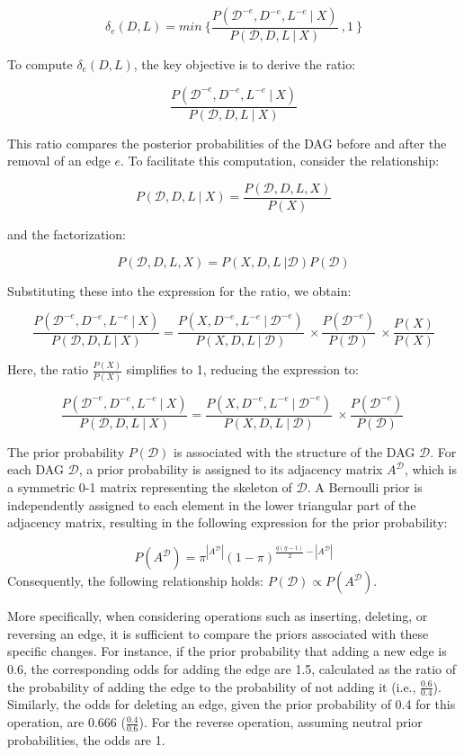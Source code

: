 \documentclass{report}
\begin{document}
$$
\delta_e (D,L) = min \  \Bigg\{ \frac{P(\mathcal{D}^{-e},D^{-e},L^{-e} \ | \ X)}{P(\mathcal{D},D,L \ | \ X)} \ ,1 \ \Bigg\} 
$$

To compute $\delta_e(D,L)$, the key objective is to derive the ratio:

$$
\frac{P(\mathcal{D}^{-e},D^{-e},L^{-e} \ | \ X)}{P(\mathcal{D},D,L \ | \ X)}
$$

This ratio compares the posterior probabilities of the DAG before and after the removal of an edge $e$. To facilitate this computation, consider the relationship:

$$
P(\mathcal{D},D,L \ | \ X) = \frac{P(\mathcal{D},D,L,X)}{P(X)}
$$

and the factorization:

$$
P(\mathcal{D},D,L,X) = P(X,D,L \ |\mathcal{D})P(\mathcal{D})
$$

Substituting these into the expression for the ratio, we obtain:

$$
\frac{P(\mathcal{D}^{-e},D^{-e},L^{-e} \ | \ X)}{P(\mathcal{D},D,L \ | \ X)} = \frac{P(X ,D^{-e},L^{-e} \ | \ \mathcal{D}^{-e})}{P(X,D,L \ | \ \mathcal{D})}\  \times \frac{P(\mathcal{D}^{-e})}{P(\mathcal{D})}\ \times \frac{P(X)}{P(X)} 
$$

Here, the ratio $\frac{P(X)}{P(X)}$  simplifies to 1, reducing the expression to:

$$
\frac{P(\mathcal{D}^{-e},D^{-e},L^{-e} \ | \ X)}{P(\mathcal{D},D,L \ | \ X)} = \frac{P(X ,D^{-e},L^{-e} \ | \ \mathcal{D}^{-e})}{P(X,D,L \ | \ \mathcal{D})}\  \times \frac{P(\mathcal{D}^{-e})}{P(\mathcal{D})}\ 
$$

The prior probability $P(\mathcal{D})$ is associated with the structure of the DAG $\mathcal{D}$. For each DAG $\mathcal{D}$, a prior probability is assigned to its adjacency matrix $A^{\mathcal{D}}$, which is a symmetric 0-1 matrix representing the skeleton of $\mathcal{D}$. A Bernoulli prior is independently assigned to each element in the lower triangular part of the adjacency matrix, resulting in the following expression for the prior probability:

$$
P(A^\mathcal{D})=\pi^{|A^\mathcal{D}|}(1- \pi)^{\frac{q(q-1)}{2}-|A^\mathcal{D}|}
$$
Consequently, the following relationship holds: $P(\mathcal{D}) \propto P(A^{\mathcal{D}})$.

More specifically, when considering operations such as inserting, deleting, or reversing an edge, it is sufficient to compare the priors associated with these specific changes. For instance, if the prior probability that adding a new edge is 0.6, the corresponding odds for adding the edge are 1.5, calculated as the ratio of the probability of adding the edge to the probability of not adding it (i.e., $\frac{0.6}{0.4}$). Similarly, the odds for deleting an edge, given the prior probability of 0.4 for this operation, are 0.666 ($\frac{0.4}{0.6}$). For the reverse operation, assuming neutral prior probabilities, the odds are 1.
\end{document}

